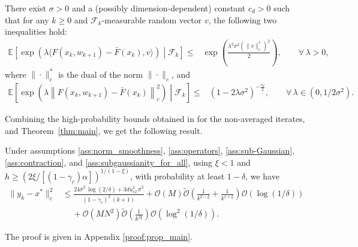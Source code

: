 \documentclass[letterpaper, 10 pt]{article}
\begin{document}
\begin{assumption}\label{ass:subgaussianity_for_all}
There exist $\sigma>0$ and a (possibly dimension-dependent) constant $c_d>0$ such that for any $k\geq 0$ and $\mathcal{F}_k$-measurable random vector $v$, the following two inequalities hold:
\begin{align}
    \mathbb{E}\left[\exp\left(\lambda \langle F(x_k,w_{k+1}) - \bar{F}(x_k), v \rangle \right) \middle| \mathcal{F}_k \right] \leq& \exp\left(\frac{\lambda^2\sigma^2 (\|v\|_{c}^*)^2}{2}\right), \qquad \forall\, \lambda> 0, \label{eq:sub-Gaussian_1}
\end{align}
where $\|\cdot\|_c^*$ is the dual of the norm $\|\cdot\|_c$, and
\begin{align}
    \mathbb{E}\left[ \exp\left( \lambda \left\| F(x_k,w_{k+1}) - \bar{F}(x_k) \right\|_c^2 \right) \middle| \mathcal{F}_k \right] \leq&  \left(1- 2 \lambda \sigma^2\right)^{-\frac{c_d}{2}}, \qquad \forall\, \lambda\in \left(0,1/2\sigma^2\right). \label{eq:sub-Gaussian_2}
\end{align}
\end{assumption}


Combining the high-probability bounds obtained in \cite[Theorem 2.4]{chen2023concentration} for the non-averaged iterates, and Theorem~\ref{thm:main}, we get the following result.

\begin{theorem}\label{prop:main}
    Under assumptions \ref{ass:norm_smoothness}, \ref{ass:operators}, \ref{ass:sub-Gaussian}, \ref{ass:contraction}, and \ref{ass:subgaussianity_for_all}, using $\xi<1$ and $h\geq (2\xi/[(1-\gamma_c)\alpha])^{1/(1-\xi)}$, with probability at least $1-\delta$, we have
\begin{align}
\|y_k-x^*\|_c^2 &\leq \frac{24 \bar{\sigma}^2\,\log(2/\delta)+3 du_{c2}^2 \,\bar{\sigma}^2}{(1-\gamma_c)^2\,(k+1)} + \mathcal{O}(M)\tilde{\mathcal{O}}\left(\frac{1}{k^{2-\xi}}  + \frac{1}{k^{1+\xi}}\right)\mathcal{O}\left(\log(1/\delta)\right) \nonumber\\
&\quad~+ \mathcal{O}(MN^2)\tilde{\mathcal{O}}\left(\frac{1}{k^{2\xi}}\right)\mathcal{O}\left(\log^2(1/\delta)\right).\label{eq:high_prob_additive}
\end{align}
\end{theorem}
The proof is given in Appendix \ref{proof:prop_main}.\\
\end{document}
